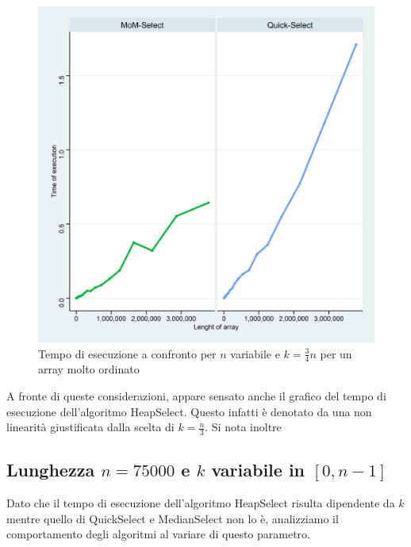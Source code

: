 \documentclass{article}
\begin{document}
	\begin{figure}[h!]		
		\centering
  		\includegraphics[width=0.7\columnwidth]{images/MoM_Quick_graph_ordered.png}
  		\caption{Tempo di esecuzione a confronto per $n$ variabile e $k=\frac{3}{4}	n$ per un array molto ordinato}
  		\label{fig:graph2}
	\end{figure}
	
	A fronte di queste considerazioni, appare sensato anche il grafico del tempo di esecuzione dell'algoritmo HeapSelect. Questo infatti è denotato da una non linearità giustificata dalla scelta di $k=\frac{n}{3}$. Si nota inoltre 
		
	\newpage
	
	\subsection{Lunghezza $n=75000$ e $k$ variabile in $[0,n-1]$}
	Dato che il tempo di esecuzione dell'algoritmo HeapSelect risulta dipendente da $k$ mentre quello di QuickSelect e MedianSelect non lo è, analizziamo il comportamento degli algoritmi al variare di questo parametro.
	
\end{document}
